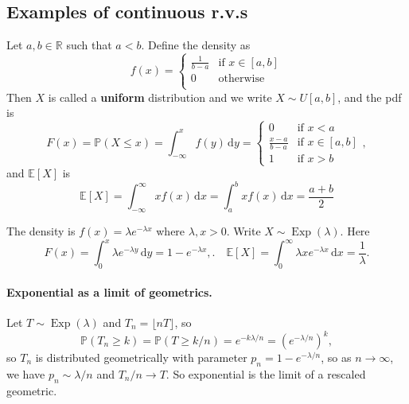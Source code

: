 \subsection{Examples of continuous r.v.s}
\begin{example}
    Let $a,b\in \mathbb{R}$ such that $a<b$. Define the density as 
\[
    f(x) = \begin{cases}
    \frac{1}{b-a} &\text{if }x\in [a,b]\\
    0 &\text{otherwise}\\
    \end{cases} 
\]
Then $X$ is called a \textbf{uniform} distribution and we write $ X \sim U[a,b] $, and the pdf is 
\[
    F(x)=\mathbb P(X\le x)=\int_{-\infty}^xf(y)\,\mathrm dy=\begin{cases}
        0&\text{if $x<a$}\\
        \frac{x-a}{b-a}&\text{if $x\in [a,b]$}\\
        1&\text{if $x>b$}
    \end{cases},
\]
and $ \mathbb{E}[X] $ is 
\[
    \mathbb E[X]=\int_{-\infty }^{\infty }xf(x)\,\mathrm dx=\int_a^bxf(x)\,\mathrm dx=\frac{a+b}{2}
\]
\end{example}

\begin{example}
    The density is $ f(x)=\lambda e^{-\lambda x} $ where $ \lambda,x>0 $. Write $ X \sim \operatorname{Exp}(\lambda) $. Here 
    \[
        F(x)=\int_0^x\lambda e^{-\lambda y}\,\mathrm dy=1-e^{-\lambda x},.\quad \mathbb{E}[X]=\int_{0}^{\infty} \lambda x e^{-\lambda x} \,\mathrm{d}x=\frac{1}{\lambda}.
    \]
    \paragraph{Exponential as a limit of geometrics.} Let $T\sim\operatorname{Exp}(\lambda)$ and $T_n=\lfloor nT\rfloor$, so
    \[
        \mathbb P(T_n\ge k)=\mathbb P(T\ge k/n)=e^{-k\lambda/n}=(e^{-\lambda/n})^k,
    \]
    so $T_n$ is distributed geometrically with parameter $p_n=1-e^{-\lambda/n}$, so as $n\to\infty$, we have $p_n\sim \lambda/n$ and $T_n/n\to T$. So exponential is the limit of a rescaled geometric.
\end{example}


